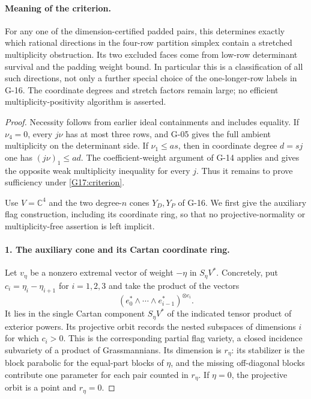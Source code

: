 \documentclass[11pt,a4paper]{article}
\theoremstyle{definition}\newtheorem{definition}{Definition}
\begin{document}
\paragraph{Meaning of the criterion.}
For any one of the dimension-certified padded pairs, this determines
exactly which rational directions in the four-row partition simplex
contain a stretched multiplicity obstruction. Its two excluded faces
come from low-row determinant survival and the padding weight bound.
In particular this is a classification of all such directions,
not only a further special choice of the one-longer-row labels in G-16.
The coordinate degrees and stretch factors remain large; no efficient
multiplicity-positivity algorithm is asserted.

\begin{proof}
Necessity follows from earlier ideal containments and includes equality.
If $\nu_4=0$, every $j\nu$ has at most three rows, and G-05 gives
the full ambient multiplicity on the determinant side. If
$\nu_1\leq as$, then in coordinate degree $d=sj$ one has
$(j\nu)_1\leq ad$. The coefficient-weight argument of G-14 applies
and gives the opposite weak multiplicity inequality for every $j$.
Thus it remains to prove sufficiency under \eqref{G17:criterion}.

Use $V=\mathbb C^4$ and the two degree-$n$ cones $Y_D,Y_P$ of G-16.
We first give the auxiliary flag construction, including its coordinate
ring, so that no projective-normality or multiplicity-free assertion
is left implicit.

\paragraph{1. The auxiliary cone and its Cartan coordinate ring.}
Let $v_\eta$ be a nonzero extremal vector of weight $-\eta$ in
$S_\eta V^*$. Concretely, put
$c_i=\eta_i-\eta_{i+1}$ for $i=1,2,3$ and take the product of
the vectors
\[
 (e_0^*\wedge\cdots\wedge e_{i-1}^*)^{\otimes c_i}.
\]
It lies in the single Cartan component $S_\eta V^*$ of the indicated
tensor product of exterior powers. Its projective orbit records the
nested subspaces of dimensions $i$ for which $c_i>0$.
This is the corresponding partial flag variety, a closed incidence
subvariety of a product of Grassmannians. Its dimension is
$r_\eta$: its stabilizer is the block parabolic for the equal-part
blocks of $\eta$, and the missing off-diagonal blocks contribute
one parameter for each pair counted in $r_\eta$.
If $\eta=0$, the projective orbit is a point and $r_\eta=0$.


\end{proof}
\end{document}
